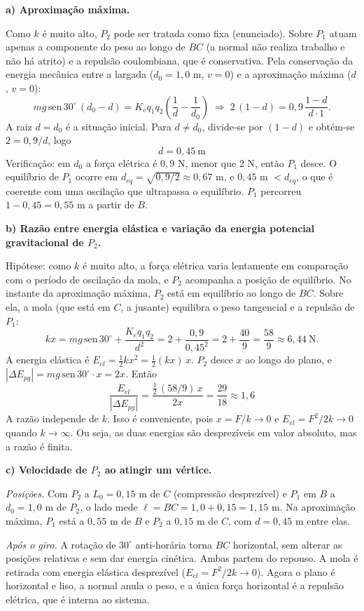 \documentclass{article}%
\begin{document}
\medskip
\textbf{a) Aproximação máxima.}

Como $k$ é muito alto, $P_2$ pode ser tratada como fixa (enunciado). Sobre $P_1$ atuam apenas a componente do peso ao longo de $BC$ (a normal não realiza trabalho e não há atrito) e a repulsão coulombiana, que é conservativa. Pela conservação da energia mecânica entre a largada ($d_0=1{,}0$ m, $v=0$) e a aproximação máxima ($d$, $v=0$):
\[
mg\,\mathrm{sen}\,30^\circ\,(d_0-d)=K_eq_1q_2\left(\frac1d-\frac1{d_0}\right)
\;\Rightarrow\;
2\,(1-d)=0{,}9\,\frac{1-d}{d\cdot 1}.
\]
A raiz $d=d_0$ é a situação inicial. Para $d\neq d_0$, divide-se por $(1-d)$ e obtém-se $2=0{,}9/d$, logo
\[
\boxed{d=0{,}45\ \text{m}}
\]
Verificação: em $d_0$ a força elétrica é $0{,}9$ N, menor que $2$ N, então $P_1$ desce. O equilíbrio de $P_1$ ocorre em $d_{eq}=\sqrt{0{,}9/2}\approx0{,}67$ m, e $0{,}45$ m $<d_{eq}$, o que é coerente com uma oscilação que ultrapassa o equilíbrio. $P_1$ percorreu $1-0{,}45=0{,}55$ m a partir de $B$.

\medskip
\textbf{b) Razão entre energia elástica e variação da energia potencial gravitacional de $P_2$.}

Hipótese: como $k$ é muito alto, a força elétrica varia lentamente em comparação com o período de oscilação da mola, e $P_2$ acompanha a posição de equilíbrio. No instante da aproximação máxima, $P_2$ está em equilíbrio ao longo de $BC$. Sobre ela, a mola (que está em $C$, a jusante) equilibra o peso tangencial e a repulsão de $P_1$:
\[
kx=mg\,\mathrm{sen}\,30^\circ+\frac{K_eq_1q_2}{d^2}=2+\frac{0{,}9}{0{,}45^2}=2+\frac{40}{9}=\frac{58}{9}\approx6{,}44\ \text{N}.
\]
A energia elástica é $E_{el}=\tfrac12kx^2=\tfrac12(kx)\,x$. $P_2$ desce $x$ ao longo do plano, e $|\Delta E_{pg}|=mg\,\mathrm{sen}\,30^\circ\cdot x=2x$. Então
\[
\frac{E_{el}}{|\Delta E_{pg}|}=\frac{\tfrac12\,(58/9)\,x}{2x}=\frac{29}{18}\approx\boxed{1{,}6}
\]
A razão independe de $k$. Isso é conveniente, pois $x=F/k\to0$ e $E_{el}=F^2/2k\to0$ quando $k\to\infty$. Ou seja, as duas energias são desprezíveis em valor absoluto, mas a razão é finita.

\medskip
\textbf{c) Velocidade de $P_2$ ao atingir um vértice.}

\emph{Posições.} Com $P_2$ a $L_0=0{,}15$ m de $C$ (compressão desprezível) e $P_1$ em $B$ a $d_0=1{,}0$ m de $P_2$, o lado mede $\ell=BC=1{,}0+0{,}15=1{,}15$ m. Na aproximação máxima, $P_1$ está a $0{,}55$ m de $B$ e $P_2$ a $0{,}15$ m de $C$, com $d=0{,}45$ m entre elas.

\emph{Após o giro.} A rotação de $30^\circ$ anti-horária torna $BC$ horizontal, sem alterar as posições relativas e sem dar energia cinética. Ambas partem do repouso. A mola é retirada com energia elástica desprezível ($E_{el}=F^2/2k\to0$). Agora o plano é horizontal e liso, a normal anula o peso, e a única força horizontal é a repulsão elétrica, que é interna ao sistema.
\end{document}
